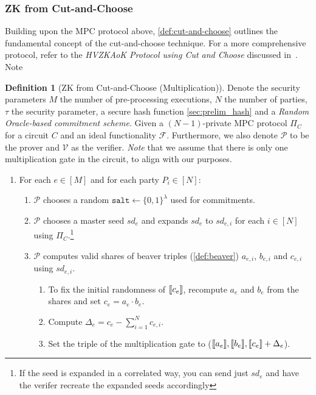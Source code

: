 \documentclass[twoside,11pt]{report}
\theoremstyle{definition}
\newtheorem{definition}{Definition}[section]
\theoremstyle{plain}
\begin{document}
\subsubsection{ZK from Cut-and-Choose}\label{sec:zk-cut-and-choose}

Building upon the MPC protocol above, \autoref{def:cut-and-choose} outlines the fundamental concept of the cut-and-choose technique. For a more comprehensive protocol, refer to the \textit{HVZKAoK Protocol using Cut and Choose} discussed in~\cite{baum2020concretely}. Note

\begin{definition}[ZK from Cut-and-Choose (Multiplication)]\label{def:cut-and-choose}
  Denote the security parameters $M$ the number of pre-processing executions, $N$ the number of parties, $\tau$ the security parameter, a secure hash function \autoref{sec:prelim_hash} and a \textit{Random Oracle-based commitment scheme}. Given a $(N-1)$-private MPC protocol $\Pi_C$ for a circuit $C$ and an ideal functionality $\mathcal{F}$. Furthermore, we also denote $\mathcal{P}$ to be the prover and $\mathcal{V}$ as the verifier. \textit{Note} that we assume that there is only one multiplication gate in the circuit, to align with our purposes.
  \begin{enumerate}[itemsep=0pt, parsep=0pt]
    \item\label{itm:cut-choose-r1} For each $e \in [M]$ and for each party $P_i \in [N]$:
    \begin{enumerate}[nolistsep]
      \item $\mathcal{P}$ chooses a random $\texttt{salt} \leftarrow \{0,1\}^\lambda$ used for commitments.
      \item $\mathcal{P}$ chooses a master seed $sd_e$ and  expands $sd_e$ to $sd_{e,i}$ for each $i \in [N]$ using $\Pi_C$.\footnote{If the seed is expanded in a correlated way, you can send just $sd_e$ and have the verifer recreate the expanded seeds accordingly}
      \item $\mathcal{P}$ computes valid shares of beaver triples (\autoref{def:beaver}) $a_{e,i}$, $b_{e, i}$ and $c_{e,i}$ using $sd_{e,i}$.
            \begin{enumerate}
              \item To fix the initial randomness of $\llbracket c_e \rrbracket$, recompute $a_e$ and $b_e$ from the shares and set $c_e = a_e \cdot b_e$.
              \item Compute $\Delta_e = c_e - \sum_{i=1}^N c_{e,i}$.
              \item Set the triple of the multiplication gate to ($\llbracket a_e \rrbracket, \llbracket b_e \rrbracket, \llbracket c_e \rrbracket + \Delta_e$).

\end{enumerate}
\end{enumerate}
\end{enumerate}
\end{definition}
\end{document}
